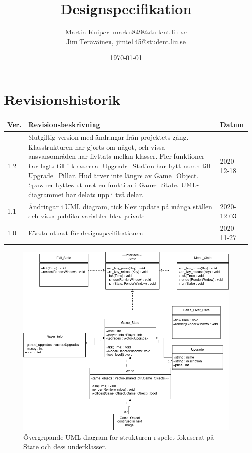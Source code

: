 \documentclass{TDP005mall}
\author{Martin Kuiper, \url{marku849@student.liu.se}\\
  Jim Teräväinen, \url{jimte145@student.liu.se}}
\title{Designspecifikation}
\date{\today}
\begin{document}
\projectpage
\section{Revisionshistorik}
\begin{table}[!h]
\begin{tabularx}{\linewidth}{|l|X|l|}
\hline
Ver. & Revisionsbeskrivning & Datum \\\hline
1.2 & Slutgiltig version med ändringar från projektets gång. Klasstrukturen har gjorts om något, och vissa ansvarsområden har flyttats mellan klasser. Fler funktioner har lagts till i klasserna. Upgrade\_Station har bytt namn till Upgrade\_Pillar. Hud ärver inte längre av Game\_Object. Spawner byttes ut mot en funktion i Game\_State. UML-diagrammet har delats upp i två delar. & 2020-12-18 \\\hline
1.1 & Ändringar i UML diagram, tick blev update på många ställen och vissa publika variabler blev private & 2020-12-03 \\\hline
1.0 & Första utkast för designspecifikationen. & 2020-11-27 \\\hline
\end{tabularx}
\end{table}

\begin{figure}[H]
         \begin{center}
             \includegraphics[width=15cm]{Graphic/overview_part1.png}
             \caption{\label{fig:1} Övergripande UML diagram för strukturen i spelet fokuserat på State och dess underklasser.}
         \end{center}
\end{figure}
\end{document}
